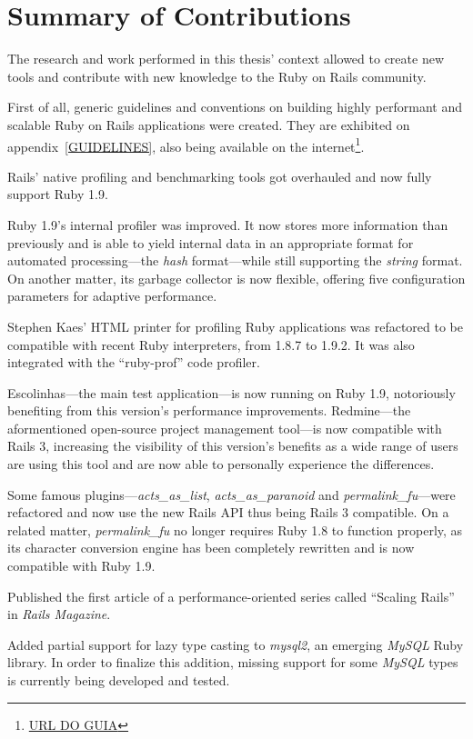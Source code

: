 \section{Summary of Contributions}
The research and work performed in this thesis' context allowed to create new tools and contribute with new knowledge to the Ruby on Rails community.

First of all, generic guidelines and conventions on building highly performant and scalable Ruby on Rails applications were created. They are exhibited on appendix~\ref{GUIDELINES}, also being available on the internet\footnote{\url{URL DO GUIA}}.

Rails' native profiling and benchmarking tools got overhauled and now fully support Ruby 1.9.

Ruby 1.9's internal profiler was improved. It now stores more information than previously and is able to yield internal data in an appropriate format for automated processing---the \textit{hash} format---while still supporting the \textit{string} format. On another matter, its garbage collector is now flexible, offering five configuration parameters for adaptive performance.

Stephen Kaes' HTML printer for profiling Ruby applications was refactored to be compatible with recent Ruby interpreters, from 1.8.7 to 1.9.2. It was also integrated with the ``ruby-prof'' code profiler.

Escolinhas---the main test application---is now running on Ruby 1.9, notoriously benefiting from this version's performance improvements. Redmine---the aformentioned open-source project management tool---is now compatible with Rails 3, increasing the visibility of this version's benefits as a wide range of users are using this tool and are now able to personally experience the differences.

Some famous plugins---\textit{acts\_as\_list}, \textit{acts\_as\_paranoid} and \textit{permalink\_fu}---were refactored and now use the new Rails API thus being Rails 3 compatible. On a related matter, \textit{permalink\_fu} no longer requires Ruby 1.8 to function properly, as its character conversion engine has been completely rewritten and is now compatible with Ruby 1.9.

Published the first article of a performance-oriented series called ``Scaling Rails'' in \textit{Rails Magazine}.

Added partial support for lazy type casting to \textit{mysql2}, an emerging \textit{MySQL} Ruby library. In order to finalize this addition, missing support for some \textit{MySQL} types is currently being developed and tested.

